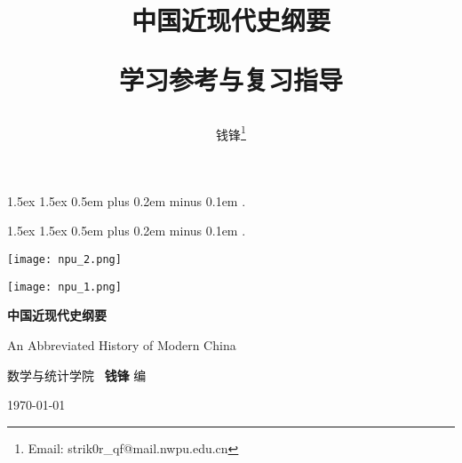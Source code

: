 \documentclass[10pt, UTF8]{ctexbook} %
\title{\textbf{中国近现代史纲要}

学习参考与复习指导}
\author{钱锋\thanks{Email: strik0r\_qf@mail.nwpu.edu.cn}}
\begin{document}
    {1.5ex}                                         %
    {1.5ex}                                         %
    {}                                              %
    {}                                              %
    {\bfseries}                                     %
    {}                                              %
    {0.5em plus 0.2em minus 0.1em}                  %
    {.}

\theoremstyle{mytheoremstyle} \newtheorem{example}{例}[section]
\theoremstyle{mytheoremstyle} \newtheorem{key}{核心要点}[section]

\theoremstyle{plain} \newtheorem{thm}{分析论述}

    {1.5ex}                                         %
    {1.5ex}                                         %
    {}                                              %
    {}                                              %
    {\kaishu}                                       %
    {}                                              %
    {0.5em plus 0.2em minus 0.1em}                  %
    {.}

\theoremstyle{my3theoremstyle}
\newtheorem*{remark}{注}
\newtheorem*{sol}{答案要点}

\begin{titlepage}
    \thispagestyle{empty}
    \centering
    \vspace*{2cm}
    \texttt{[image: npu\_2.png]}\par
    \vspace{1cm}
    \texttt{[image: npu\_1.png]}\par
    \vspace{1cm}
        \begin{center}
            \Huge {\heiti \textbf{中国近现代史纲要}}

            An Abbreviated History of Modern China
        \end{center}
        \vspace{5cm}
        \begin{center}
        \songti
        \kaishu 数学与统计学院 \, \heiti\textbf{钱锋} \quad \songti 编
        \vspace{0.5cm}

    \today
    \end{center}
\end{titlepage}
\end{document}
